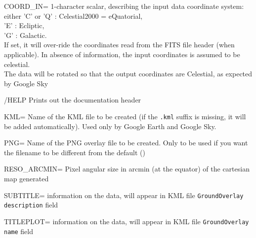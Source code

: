 \begin{keywords}
  \begin{kwlist}{} %
\item [COORD\_IN= \mytarget{idl:hpx2gs:coord_in}] 1-character scalar, describing the input data coordinate system:\\
                either 'C' or 'Q' : Celestial2000 = eQuatorial,\\
                       'E'        : Ecliptic,\\
                       'G'        : Galactic.\\
             If set, it will over-ride the coordinates read from the FITS file header (when
             applicable). In absence of information, the input coordinates is
assumed to be celestial.\\
             The data will be rotated so that the output coordinates are Celestial, as expected by Google Sky

\item [{/HELP} \mytarget{idl:hpx2gs:help}]  Prints out the documentation header 

\item [{KML=} \mytarget{idl:hpx2gs:kml}] Name of the KML file to be created (if the {\tt .kml} suffix is missing,
     it will be added automatically). Used only by Google Earth and Google Sky.

\item [{PNG=} \mytarget{idl:hpx2gs:png}] Name of the PNG overlay file to be created. Only to be used if you want the
     filename to be different from the default 
	()

\item [{RESO\_ARCMIN=} \mytarget{idl:hpx2gs:reso_arcmin}] Pixel angular size in arcmin (at the equator) of the cartesian
     map generated 

\item [{SUBTITLE=} \mytarget{idl:hpx2gs:subtitle}] information on the data, 
will appear in KML file {\tt GroundOverlay
     description} field

\item [{TITLEPLOT=} \mytarget{idl:hpx2gs:titleplot}] information on the data, 
will appear in KML file {\tt GroundOverlay
     name} field


\end{kwlist}
\end{keywords}
